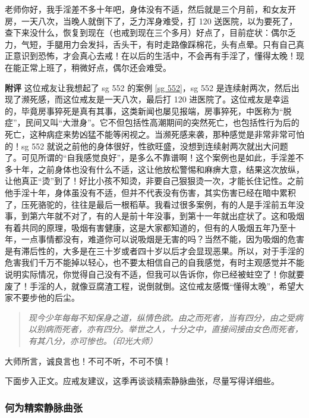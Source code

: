 \begin{case}
    老师你好，我手淫差不多十年吧，身体没有不适，然后就是三个月前，和女友开房，一天八次，当晚人就倒下了，乏力浑身难受，打 120 送医院，以为要死了，查下来没什么，恢复到现在（也戒到现在三个多月）好点了，目前症状：偶尔乏力，气短，手腿用力会发抖，舌头干，有时走路像踩棉花，头有点晕。只有自己真正意识到恐怖，才会真心去戒！在以后的生活中，不会再有手淫了，懂得太晚！现在能正常上班了，稍微好点，偶尔还会难受。

    \textbf{附评} 这位戒友让我想起了 sg 552 的案例 \ref{sg 552}，sg 552 是连续射两次，然后出现了濒死感，而这位戒友是一天八次，最后打 120 进医院了。这位戒友是幸运的，毕竟房事猝死是真有其事，这类新闻也屡见报端，房事猝死，中医称为“脱症”，民间又叫“大泄身”。它不但包括性高潮期间的突然死亡，也包括性行为后的死亡，这种病症来势凶猛不能等闲视之。当濒死感来袭，那种感觉是非常非常可怕的！sg 552 就说之前他的身体很好，性欲旺盛，没想到连续射两次就出大问题了。可见所谓的“自我感觉良好”，是多么不靠谱啊！这个案例也是如此，手淫差不多十年，之前身体也没有什么不适，这让他放松警惕和麻痹大意，结果这次放纵，让他真正“烫”到了！好比小孩不知烫，非要自己狠狠烫一次，才能长住记性。之前他手淫十年，身体虽没有不适，但并不代表没有伤害，其实伤害已经在暗中累积了，压死骆驼的，往往是最后一根稻草。我看过很多案例，有的人是手淫前五年没事，到第六年就不对了，有的人是前十年没事，到第十一年就出症状了。这和吸烟有着共同的原理，吸烟有害健康，这是大家都知道的，但有的人吸烟五年乃至十年，一点事情都没有，难道你可以说吸烟是无害的吗？当然不能，因为吸烟的危害是有滞后性的，大多是在三十岁或者四十岁以后才会显现恶果。所以，对于手淫的危害我们千万不能掉以轻心，也不要太相信自己的自我感觉，有时主观感觉并不能说明实际情况，你觉得自己没有不适，但我可以告诉你，你已经被蛀空了！你就要废了！手淫的人，就像豆腐渣工程，说倒就倒。这位戒友感慨“懂得太晚”，希望大家不要步他的后尘。

    \begin{quote}\it
        现今少年每每不知保身之道，纵情色欲。由之而死者，当有四分，由之受病以别病而死者，亦有四分。举世之人，十分之中，直接间接由女色而死者，有其八分，亦可惨也。（印光大师）
    \end{quote}

    大师所言，诚良言也！不可不听，不可不慎！
\end{case}

下面步入正文。应戒友建议，这季再谈谈精索静脉曲张，尽量写得详细些。

\subsubsection{何为精索静脉曲张}


